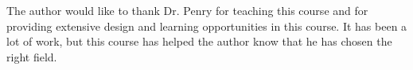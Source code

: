 \documentclass[prodmode,acmtecs]{acmsmall} %
\begin{document}
\begin{acks}
The author would like to thank Dr. Penry for teaching this course and for
providing extensive design and learning opportunities in this course. It has
been a lot of work, but this course has helped the author know that he has
chosen the right field.
\end{acks}

% 
% 

\end{document}
